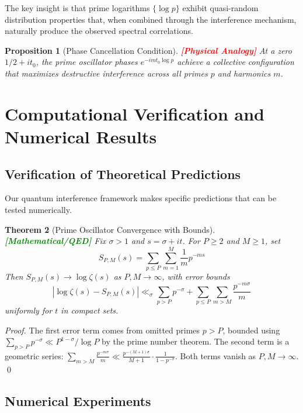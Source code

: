 \documentclass[12pt]{article}
\theoremstyle{plain}
\newtheorem{theorem}{Theorem}[section]
\newtheorem{proposition}[theorem]{Proposition}
\theoremstyle{definition}
\newcommand{\statusmath}{\textcolor{green}{\textbf{[Mathematical/QED]}}}
\newcommand{\statusanalogy}{\textcolor{red}{\textbf{[Physical Analogy]}}}
\begin{document}
The key insight is that prime logarithms $\{\log p\}$ exhibit quasi-random distribution properties \cite{bogomolny-keating1996} that, when combined through the interference mechanism, naturally produce the observed spectral correlations.

\begin{proposition}[Phase Cancellation Condition] \statusanalogy
At a zero $1/2 + it_0$, the prime oscillator phases $e^{-imt_0\log p}$ achieve a collective configuration that maximizes destructive interference across all primes $p$ and harmonics $m$.
\end{proposition}



\section{Computational Verification and Numerical Results}

\subsection{Verification of Theoretical Predictions}

Our quantum interference framework makes specific predictions that can be tested numerically.

\begin{theorem}[Prime Oscillator Convergence with Bounds] \statusmath
Fix $\sigma > 1$ and $s = \sigma + it$. For $P \geq 2$ and $M \geq 1$, set
$$
S_{P,M}(s) = \sum_{p \leq P}\sum_{m=1}^{M} \frac{1}{m} p^{-ms}
$$
Then $S_{P,M}(s) \to \log\zeta(s)$ as $P, M \to \infty$, with error bounds
$$
\left|\log\zeta(s) - S_{P,M}(s)\right| \ll_{\sigma} \sum_{p > P} p^{-\sigma} + \sum_{p \leq P}\sum_{m > M} \frac{p^{-m\sigma}}{m}
$$
uniformly for $t$ in compact sets.
\end{theorem}

\begin{proof}
The first error term comes from omitted primes $p > P$, bounded using $\sum_{p > P} p^{-\sigma} \ll P^{1-\sigma}/\log P$ by the prime number theorem. The second term is a geometric series: $\sum_{m > M} \frac{p^{-m\sigma}}{m} \ll \frac{p^{-(M+1)\sigma}}{M+1} \cdot \frac{1}{1-p^{-\sigma}}$. Both terms vanish as $P, M \to \infty$. \qed
\end{proof}


\subsection{Numerical Experiments}
\end{document}
